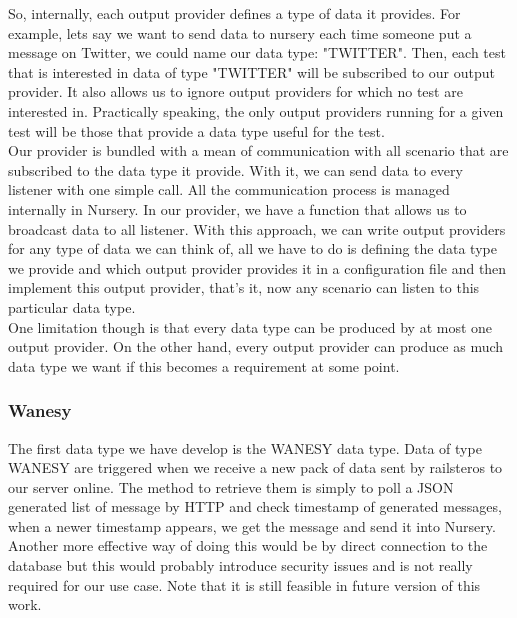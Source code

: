 \documentclass[12pt]{article}
\theoremstyle{definition}
\theoremstyle{definition}
\theoremstyle{remark}
\begin{document}
So, internally, each output provider defines a type of data it provides. For example, lets say we want to send data to nursery each time someone put a message on Twitter, we could name our data type: "TWITTER". Then, each test that is interested in data of type "TWITTER" will be subscribed to our output provider. It also allows us to ignore output providers for which no test are interested in. Practically speaking, the only output providers running for a given test will be those that provide a data type useful for the test.\\

Our provider is bundled with a mean of communication with all scenario that are subscribed to the data type it provide. With it, we can send data to every listener with one simple call. All the communication process is managed internally in Nursery.
In our provider, we have a function that allows us to broadcast data to all listener. With this approach, we can write output providers for any type of data we can think of, all we have to do is defining the data type we provide and which output provider provides it in a configuration file and then implement this output provider, that's it, now any scenario can listen to this particular data type.\\

One limitation though is that every data type can be produced by at most one output provider. On the other hand, every output provider can produce as much data type we want if this becomes a requirement at some point.\\

\subsubsection{Wanesy}

The first data type we have develop is the WANESY data type. Data of type WANESY are triggered when we receive a new pack of data sent by \gls{railsteros} to our server online. The method to retrieve them is simply to poll a JSON generated list of message by HTTP and check timestamp of generated messages, when a newer timestamp appears, we get the message and send it into Nursery.\\

Another more effective way of doing this would be by direct connection to the database but this would probably introduce security issues and is not really required for our use case. Note that it is still feasible in future version of this work.
\end{document}
